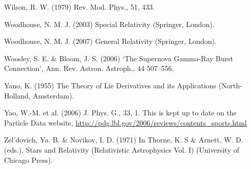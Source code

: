 {Wilson, R. W. (1979) Rev. Mod. Phys., 51, 433.


Woodhouse, N. M. J. (2003) Special Relativity (Springer, London).


Woodhouse, N. M. J. (2007) General Relativity (Springer, London).


Woosley, S. E. \& Bloom, J. S. (2006) ‘The Supernova Gamma-Ray Burst Connection’, Ann. Rev. Astron. Astroph., 44 507–556.


Yano, K. (1955) The Theory of Lie Derivatives and its Applications (North-Holland, Amsterdam).


Yao, W.-M. et al. (2006) J. Phys. G., 33, 1. This is kept up to date on the Particle Data website, \url{http://pdg.lbl.gov/2006/reviews/contents_sports.html}

Zel’dovich, Ya. B. \& Novikov, I. D. (1971) In Thorne, K. S \& Arnett, W. D. (eds.), Stars and Relativity (Relativistic Astrophysics Vol. I) (University of Chicago Press).

}